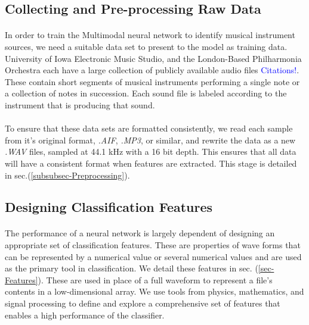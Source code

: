\documentclass[12pt,letterpaper]{article}
\begin{document}

\subsection{Collecting and Pre-processing Raw Data}

\paragraph*{}In order to train the Multimodal neural network to identify musical instrument sources, we need a suitable data set to present to the model as training data. University of Iowa Electronic Music Studio, and the London-Based Philharmonia Orchestra each have a large collection of publicly available audio files \textcolor{blue}{Citations!}. These contain short segments of musical instruments performing a single note or a collection of notes in succession. Each sound file is labeled according to the instrument that is producing that sound.

\paragraph*{}To ensure that these data sets are formatted consistently, we read each sample from it's original format, \textit{.AIF}, \textit{.MP3}, or similar, and rewrite the data as a new \textit{.WAV} files, sampled at 44.1 kHz with a 16 bit depth. This ensures that all data will have a consistent format when features are extracted. This stage is detailed in sec.(\ref{subsubsec-Preprocessing}).

\subsection{Designing Classification Features}

\paragraph*{}The performance of a neural network is largely dependent of designing an appropriate set of classification features. These are properties of wave forms that can be represented by a numerical value or several numerical values and are used as the primary tool in classification. We detail these features in sec. (\ref{sec-Features}). These are used in place of a full waveform to represent a file's contents in a low-dimensional array. We use tools from physics, mathematics, and signal processing to define and explore a comprehensive set of features that enables a high performance of the classifier. 
\end{document}
